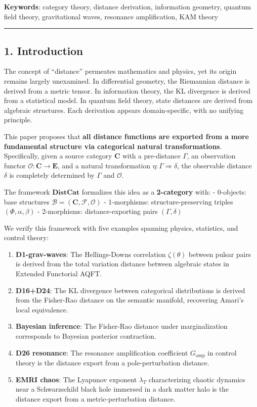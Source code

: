 \documentclass[
]{article}
\providecommand{\tightlist}{%
  \setlength{\itemsep}{0pt}\setlength{\parskip}{0pt}}
\begin{document}
\textbf{Keywords}: category theory, distance derivation, information
geometry, quantum field theory, gravitational waves, resonance
amplification, KAM theory

\begin{center}\rule{0.5\linewidth}{0.5pt}\end{center}

\subsection{1. Introduction}\label{introduction}

The concept of ``distance'' permeates mathematics and physics, yet its
origin remains largely unexamined. In differential geometry, the
Riemannian distance is derived from a metric tensor. In information
theory, the KL divergence is derived from a statistical model. In
quantum field theory, state distances are derived from algebraic
structures. Each derivation appears domain-specific, with no unifying
principle.

This paper proposes that \textbf{all distance functions are exported
from a more fundamental structure via categorical natural
transformations}. Specifically, given a source category \(\mathbf{C}\)
with a pre-distance \(\Gamma\), an observation functor
\(\mathcal{O}: \mathbf{C} \to \mathbf{E}\), and a natural transformation
\(\eta: \Gamma \Rightarrow \delta\), the observable distance \(\delta\)
is completely determined by \(\Gamma\) and \(\mathcal{O}\).

The framework \(\mathbf{DistCat}\) formalizes this idea as a
\textbf{2-category} with: - 0-objects: base structures
\(\mathcal{B} = (\mathbf{C}, \mathcal{F}, \mathcal{O})\) - 1-morphisms:
structure-preserving triples \((\Phi, \alpha, \beta)\) - 2-morphisms:
distance-exporting pairs \((\Gamma, \delta)\)

We verify this framework with five examples spanning physics,
statistics, and control theory:

\begin{enumerate}
\def\labelenumi{\arabic{enumi}.}
\tightlist
\item
  \textbf{D1-grav-waves}: The Hellings-Downs correlation
  \(\zeta(\theta)\) between pulsar pairs is derived from the total
  variation distance between algebraic states in Extended Functorial
  AQFT.
\item
  \textbf{D16+D24}: The KL divergence between categorical distributions
  is derived from the Fisher-Rao distance on the semantic manifold,
  recovering Amari's local equivalence.
\item
  \textbf{Bayesian inference}: The Fisher-Rao distance under
  marginalization corresponds to Bayesian posterior contraction.
\item
  \textbf{D26 resonance}: The resonance amplification coefficient
  \(G_{\text{amp}}\) in control theory is the distance export from a
  pole-perturbation distance.
\item
  \textbf{EMRI chaos}: The Lyapunov exponent \(\lambda_T\)
  characterizing chaotic dynamics near a Schwarzschild black hole
  immersed in a dark matter halo is the distance export from a
  metric-perturbation distance.
\end{enumerate}
\end{document}
